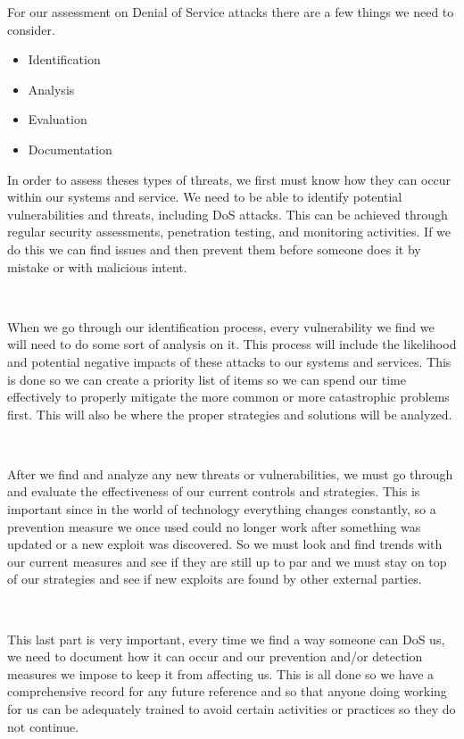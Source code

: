 \documentclass[12pt,a4paper]{report}
\begin{document}
For our assessment on Denial of Service attacks there are a few things we need to consider.
\begin{itemize}
 \item Identification
 \item Analysis
 \item Evaluation
 \item Documentation
\end{itemize}

In order to assess theses types of threats, we first must know how they can occur within our systems and service.
We need to be able to identify potential vulnerabilities and threats, including DoS attacks.
This can be achieved through regular security assessments, penetration testing, and monitoring activities.
If we do this we can find issues and then prevent them before someone does it by mistake or with malicious intent.

\

When we go through our identification process, every vulnerability we find we will need to do some sort of analysis on it.
This process will include the likelihood and potential negative impacts of these attacks to our systems and services.
This is done so we can create a priority list of items so we can spend our time effectively to properly mitigate the more common or more catastrophic problems first.
This will also be where the proper strategies and solutions will be analyzed.

\

After we find and analyze any new threats or vulnerabilities, we must go through and evaluate the effectiveness of our current controls and strategies.
This is important since in the world of technology everything changes constantly, so a prevention measure we once used could no longer work after something was updated or a new exploit was discovered.
So we must look and find trends with our current measures and see if they are still up to par and we must stay on top of our strategies and see if new exploits are found by other external parties.

\

This last part is very important, every time we find a way someone can DoS us, we need to document how it can occur and our prevention and/or detection measures we impose to keep it from affecting us.
This is all done so we have a comprehensive record for any future reference and so that anyone doing working for us can be adequately trained to avoid certain activities or practices so they do not continue.
\end{document}
